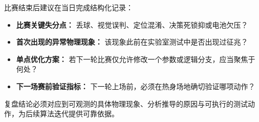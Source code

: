 比赛结束后建议在当日完成结构化记录：
\begin{itemize}[leftmargin=*]
    \item \textbf{比赛关键失分点：} 丢球、视觉误判、定位混淆、决策死锁抑或电池欠压？
    \item \textbf{首次出现的异常物理现象：} 该现象此前在实验室测试中是否出现过征兆？
    \item \textbf{单点优化方案：} 若下一轮比赛仅允许修改一个参数或逻辑分支，应当聚焦于何处？
    \item \textbf{下一场赛前验证指标：} 下一轮上场前，必须在热身场地确切验证哪项动作？
\end{itemize}

\noindent 复盘结论必须对应到可观测的具体物理现象、分析推导的原因与可执行的测试动作，为后续算法迭代提供可靠依据。

\newpage